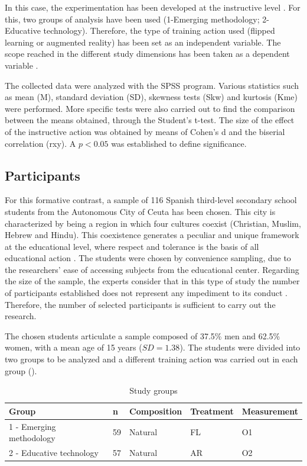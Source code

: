 \documentclass[english]{textolivre}
\begin{document}
In this case, the experimentation has been developed at the instructive level \cite{morenoguerrero+romerorodriguez+lopezbelmonte+alonsogarcia2020}. %
For this, two groups of analysis have been used (1-Emerging methodology; 2-Educative technology). Therefore, the type of training action used (flipped learning or augmented reality) has been set as an independent variable. The scope reached in the different study dimensions has been taken as a dependent variable \cite{hinojolucena2019}. %

The collected data were analyzed with the SPSS program. Various statistics such as mean (M), standard deviation (SD), skewness tests (Skw) and kurtosis (Kme) were performed. More specific tests were also carried out to find the comparison between the means obtained, through the Student's t-test. The size of the effect of the instructive action was obtained by means of Cohen's d and the biserial correlation (rxy). A $p<0.05$ was established to define significance.

\subsection{Participants}
For this formative contrast, a sample of 116 Spanish third-level secondary school students from the Autonomous City of Ceuta has been chosen. This city is characterized by being a region in which four cultures coexist (Christian, Muslim, Hebrew and Hindu). This coexistence generates a peculiar and unique framework at the educational level, where respect and tolerance is the basis of all educational action \cite{lopezbelmonte+morenoguerrero+lopeznunes+pozosanchez2019}. %
The students were chosen by convenience sampling, due to the researchers' ease of accessing subjects from the educational center. Regarding the size of the sample, the experts consider that in this type of study the number of participants established does not represent any impediment to its conduct \cite{chou2019, yilmaz2018}. Therefore, the number of selected participants is sufficient to carry out the research.

The chosen students articulate a sample composed of 37.5\% men and 62.5\% women, with a mean age of 15 years ($SD = 1.38$). The students were divided into two groups to be analyzed and a different training action was carried out in each group ().

\begin{table}[htpb]
\caption{Study groups}
\label{tab1}
\centering
\begin{tabular}{lllll}
\toprule 
Group & n & Composition & Treatment & Measurement
\\ 
\midrule
1 - Emerging methodology & 59 & Natural & FL & O1
\\ 
2 - Educative technology & 57 & Natural & AR & O2
 \\ 
\bottomrule
\end{tabular}
\centering
{}
\end{table}
\end{document}
